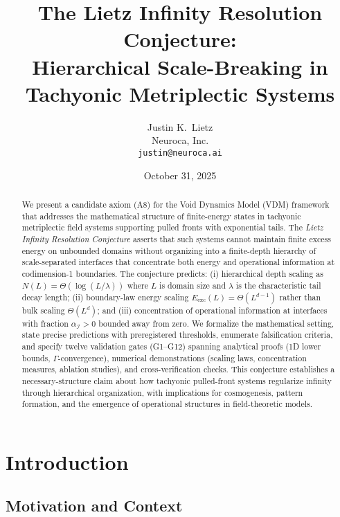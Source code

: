 \documentclass{article}
\title{The Lietz Infinity Resolution Conjecture:\\
Hierarchical Scale-Breaking in Tachyonic Metriplectic Systems}
\author{Justin K.\ Lietz\\
Neuroca, Inc.\\
\texttt{justin@neuroca.ai}}
\date{October 31, 2025}
\begin{document}
\maketitle

\begin{abstract}
We present a candidate axiom (A8) for the Void Dynamics Model (VDM) framework that addresses the mathematical structure of finite-energy states in tachyonic metriplectic field systems supporting pulled fronts with exponential tails. The \emph{Lietz Infinity Resolution Conjecture} asserts that such systems cannot maintain finite excess energy on unbounded domains without organizing into a finite-depth hierarchy of scale-separated interfaces that concentrate both energy and operational information at codimension-1 boundaries. The conjecture predicts: (i) hierarchical depth scaling as $N(L) = \Theta(\log(L/\lambda))$ where $L$ is domain size and $\lambda$ is the characteristic tail decay length; (ii) boundary-law energy scaling $E_{\text{exc}}(L) = \Theta(L^{d-1})$ rather than bulk scaling $\Theta(L^d)$; and (iii) concentration of operational information at interfaces with fraction $\alpha_{\mathcal{I}} > 0$ bounded away from zero. We formalize the mathematical setting, state precise predictions with preregistered thresholds, enumerate falsification criteria, and specify twelve validation gates (G1--G12) spanning analytical proofs (1D lower bounds, $\Gamma$-convergence), numerical demonstrations (scaling laws, concentration measures, ablation studies), and cross-verification checks. This conjecture establishes a necessary-structure claim about how tachyonic pulled-front systems regularize infinity through hierarchical organization, with implications for cosmogenesis, pattern formation, and the emergence of operational structures in field-theoretic models.
\end{abstract}


\section{Introduction}

\subsection*{Motivation and Context}
\end{document}
